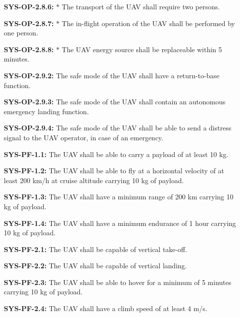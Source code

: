 \begin{enumerate}[leftmargin =4.5cm, align=parleft, labelwidth=10em]
    \item[\textbf{SYS-OP-2.8.6:} $\ast$ ] The transport of the UAV shall require two persons.
    \item[\textbf{SYS-OP-2.8.7:} $\ast$ ] The in-flight operation of the UAV shall be performed by one person.
    \item[\textbf{SYS-OP-2.8.8:} $\ast$ ] The UAV energy source shall be replaceable within 5 minutes.
    \item[\textbf{SYS-OP-2.9.2:}] The safe mode of the UAV shall have a return-to-base function.
    \item[\textbf{SYS-OP-2.9.3:}] The safe mode of the UAV shall contain an autonomous emergency landing function.
    \item[\textbf{SYS-OP-2.9.4:}] The safe mode of the UAV shall be able to send a distress signal to the UAV operator, in case of an emergency.
    \item[\textbf{SYS-PF-1.1:} \ddag] The UAV shall be able to carry a payload of at least 10 kg.
	\item[\textbf{SYS-PF-1.2:} \ddag] The UAV shall be able to fly at a horizontal velocity of at least 200 km/h at cruise altitude carrying 10 kg of payload.
	\item[\textbf{SYS-PF-1.3:} \dag] The UAV shall have a minimum range of 200 km carrying 10 kg of payload.
	\item[\textbf{SYS-PF-1.4:}] The UAV shall have a minimum endurance of 1 hour carrying 10 kg of payload.
	\item[\textbf{SYS-PF-2.1:} \dag \ddag] The UAV shall be capable of vertical take-off.
	\item[\textbf{SYS-PF-2.2:} \dag \ddag] The UAV shall be capable of vertical landing.
	\item[\textbf{SYS-PF-2.3:}] The UAV shall be able to hover for a minimum of 5 minutes carrying 10 kg of payload.
	\item[\textbf{SYS-PF-2.4:}] The UAV shall have a climb speed of at least 4 m/s.

\end{enumerate}
